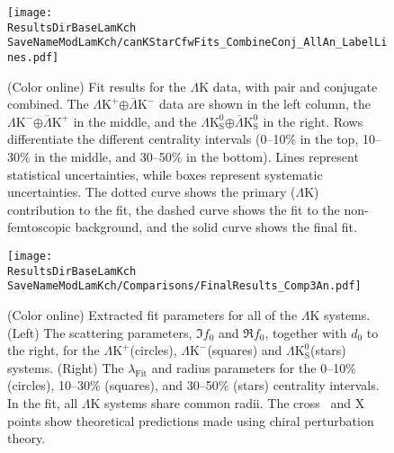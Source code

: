 \documentclass[ALICE,manyauthors]{cernphprep}
\newcommand{\ResultsDirBaseLamKch}{/home/jesse/Analysis/FemtoAnalysis/Results/Results_cLamcKch_20190319/}
\newcommand{\ResultsDirBaseLamKs}{/home/jesse/Analysis/FemtoAnalysis/Results/Results_cLamK0_20190319/}
\newcommand{\MomRes}{_MomResCrctn}%
\newcommand{\NonFlatBgdLamKch}{_NonFlatBgdCrctnLamK0LamKchPolynomial}
\newcommand{\NonFlatBgdLamKs}{_NonFlatBgdCrctnLamK0LamKchPolynomial}
\newcommand{\ResNum}{_3Res}
\newcommand{\PrimMaxDecay}{_PrimMaxDecay10fm}
\newcommand{\ResMethod}{_UsingXiDataAndCoulombOnly}
\newcommand{\ParamFixAndShareLamKch}{_ShareLam_Dualie_ShareLam_ShareRadii}
\newcommand{\ParamFixAndShareLamKs}{_ShareLam_Dualie_ShareLam_ShareRadii}
\newcommand{\SaveNameModLamKch}{\MomRes\NonFlatBgdLamKch\ResNum\PrimMaxDecay\ResMethod\ParamFixAndShareLamKch}
\newcommand{\SaveNameModLamKs}{\MomRes\NonFlatBgdLamKs\ResNum\PrimMaxDecay\ResMethod\ParamFixAndShareLamKs}
\newcommand{\LamK}{$\Lambda$K\xspace}
\newcommand{\LamKchP}{$\Lambda\mathrm{K^{+}}$\xspace}
\newcommand{\ALamKchM}{$\overline{\Lambda}\mathrm{K^{-}}$\xspace}
\newcommand{\LamKchM}{$\Lambda\mathrm{K^{-}}$\xspace}
\newcommand{\ALamKchP}{$\overline{\Lambda}\mathrm{K^{+}}$\xspace}
\newcommand{\LamKs}{$\Lambda\mathrm{K^{0}_{S}}$\xspace}
\newcommand{\ALamKs}{$\overline{\Lambda}\mathrm{K^{0}_{S}}$\xspace}
\begin{document}
\begin{figure}[h!]
  \centering
  \texttt{[image: \\ResultsDirBaseLamKch\\SaveNameModLamKch/canKStarCfwFits\_CombineConj\_AllAn\_LabelLines.pdf]}
  \caption[\LamK data with fits]
  {
  (Color online) Fit results for the \LamK data, with pair and conjugate combined.
  The \LamKchP$\oplus$\ALamKchM data are shown in the left column, the \LamKchM$\oplus$\ALamKchP in the middle, and the \LamKs$\oplus$\ALamKs in the right. 
  Rows differentiate the different centrality intervals (0--10\% in the top, 10--30\% in the middle, and 30--50\% in the bottom).
  Lines represent statistical uncertainties, while boxes represent systematic uncertainties.
  The dotted curve shows the primary (\LamK) contribution to the fit, the dashed curve shows the fit to the non-femtoscopic background, and the solid curve shows the final fit.
 }
  \label{fig:LamKFits_3Res}
\end{figure}

\begin{figure}[h]
  \centering
  \texttt{[image: \\ResultsDirBaseLamKch\\SaveNameModLamKch/Comparisons/FinalResults\_Comp3An.pdf]}
  \caption[Extracted Scattering Parameters]
  {
  (Color online) Extracted fit parameters for all of the \LamK systems.  
  (Left) The scattering parameters, $\Im f_{0}$ and $\Re f_{0}$, together with $d_{0}$ to the right, for the \LamKchP (circles), \LamKchM (squares) and \LamKs (stars) systems.  
  (Right) The $\lambda_{\mathrm{Fit}}$ and radius parameters for the 0--10\% (circles), 10--30\% (squares), and 30--50\% (stars) centrality intervals.  
  In the fit, all \LamK systems share common radii.
  The cross~\cite{Liu:2006xja} and X~\cite{Mai:2009ce} points show theoretical predictions made using chiral perturbation theory.
  }
  \label{fig:ScattParams_3Res}
\end{figure}
\end{document}
